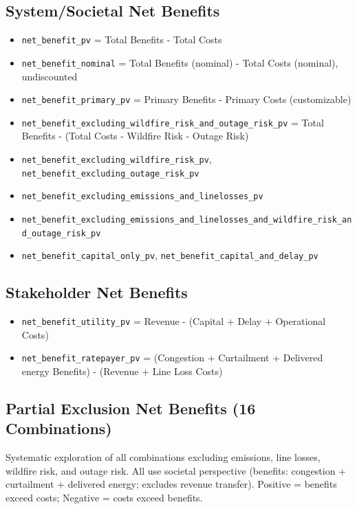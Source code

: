 \documentclass[ctcc_full_documentation.tex]{subfiles}
\begin{document}
\subsection{System/Societal Net Benefits}
\begin{itemize}
\item \texttt{net\_benefit\_pv} = Total Benefits - Total Costs
\item \texttt{net\_benefit\_nominal} = Total Benefits (nominal) - Total Costs (nominal), undiscounted
\item \texttt{net\_benefit\_primary\_pv} = Primary Benefits - Primary Costs (customizable)
\item \texttt{net\_benefit\_excluding\_wildfire\_risk\_and\_outage\_risk\_pv} = Total Benefits - (Total Costs - Wildfire Risk - Outage Risk)
\item \texttt{net\_benefit\_excluding\_wildfire\_risk\_pv}, \texttt{net\_benefit\_excluding\_outage\_risk\_pv}
\item \texttt{net\_benefit\_excluding\_emissions\_and\_linelosses\_pv}
\item \texttt{net\_benefit\_excluding\_emissions\_and\_linelosses\_and\_wildfire\_risk\_and\_outage\_risk\_pv}
\item \texttt{net\_benefit\_capital\_only\_pv}, \texttt{net\_benefit\_capital\_and\_delay\_pv}
\end{itemize}

\subsection{Stakeholder Net Benefits}
\begin{itemize}
\item \texttt{net\_benefit\_utility\_pv} = Revenue - (Capital + Delay + Operational Costs)
\item \texttt{net\_benefit\_ratepayer\_pv} = (Congestion + Curtailment + Delivered energy Benefits) - (Revenue + Line Loss Costs)
\end{itemize}

\subsection{Partial Exclusion Net Benefits (16 Combinations)}

Systematic exploration of all combinations excluding emissions, line losses, wildfire risk, and outage risk. All use societal perspective (benefits: congestion + curtailment + delivered energy; excludes revenue transfer). Positive = benefits exceed costs; Negative = costs exceed benefits.
\end{document}
